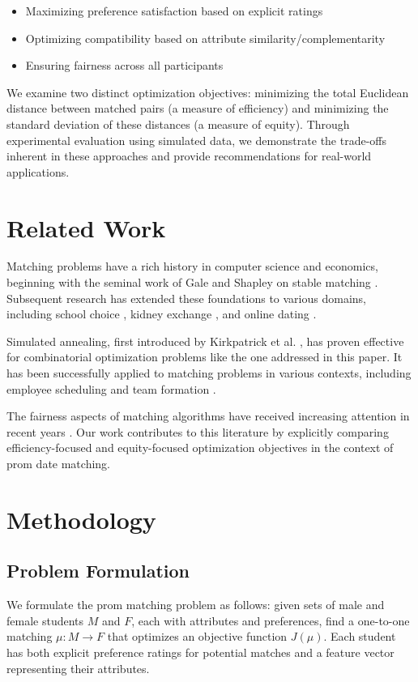 \documentclass[10pt,journal,compsoc]{IEEEtran}
\begin{document}
\begin{itemize}
\item Maximizing preference satisfaction based on explicit ratings
\item Optimizing compatibility based on attribute similarity/complementarity
\item Ensuring fairness across all participants
\end{itemize}

We examine two distinct optimization objectives: minimizing the total Euclidean distance between matched pairs (a measure of efficiency) and minimizing the standard deviation of these distances (a measure of equity). Through experimental evaluation using simulated data, we demonstrate the trade-offs inherent in these approaches and provide recommendations for real-world applications.

\section{Related Work}
Matching problems have a rich history in computer science and economics, beginning with the seminal work of Gale and Shapley on stable matching \cite{gale1962college}. Subsequent research has extended these foundations to various domains, including school choice \cite{abdulkadiroglu2003school}, kidney exchange \cite{roth2004kidney}, and online dating \cite{hitsch2010matching}.

Simulated annealing, first introduced by Kirkpatrick et al. \cite{kirkpatrick1983optimization}, has proven effective for combinatorial optimization problems like the one addressed in this paper. It has been successfully applied to matching problems in various contexts, including employee scheduling \cite{thompson1996shift} and team formation \cite{ahmadi2018simulated}.

The fairness aspects of matching algorithms have received increasing attention in recent years \cite{abdulkadiroglu2003school, baiou2000student}. Our work contributes to this literature by explicitly comparing efficiency-focused and equity-focused optimization objectives in the context of prom date matching.

\section{Methodology}

\subsection{Problem Formulation}
We formulate the prom matching problem as follows: given sets of male and female students $M$ and $F$, each with attributes and preferences, find a one-to-one matching $\mu: M \rightarrow F$ that optimizes an objective function $J(\mu)$. Each student has both explicit preference ratings for potential matches and a feature vector representing their attributes.
\end{document}

